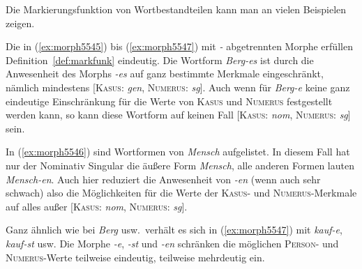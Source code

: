 Die Markierungsfunktion von Wortbestandteilen kann man an vielen Beispielen zeigen.

\begin{exe}
  \ex \label{ex:morph5545}
  \begin{xlist}
  \end{xlist}
  \ex \label{ex:morph5546}
  \begin{xlist}
  \end{xlist}
  \ex \label{ex:morph5547}
  \begin{xlist}
  \end{xlist}
\end{exe}

Die in (\ref{ex:morph5545}) bis (\ref{ex:morph5547}) mit \textit{-} abgetrennten Morphe erfüllen Definition~\ref{def:markfunk} eindeutig.
Die Wortform \textit{Berg-es} ist durch die Anwesenheit des Morphs \textit{-es} auf ganz bestimmte Merkmale eingeschränkt, nämlich mindestens [\textsc{Kasus}: \textit{gen}, \textsc{Numerus}: \textit{sg}].
\label{abs:4578239547}Auch wenn für \textit{Berg-e} keine ganz eindeutige Einschränkung für die Werte von \textsc{Kasus} und \textsc{Numerus} festgestellt werden kann, so kann diese Wortform \zB auf keinen Fall [\textsc{Kasus}: \textit{nom}, \textsc{Numerus}: \textit{sg}] sein.

In (\ref{ex:morph5546}) sind Wortformen von \textit{Mensch} aufgelistet.
In diesem Fall hat nur der Nominativ Singular die äußere Form \textit{Mensch}, alle anderen Formen lauten \textit{Mensch-en}.
Auch hier reduziert die Anwesenheit von \textit{-en} (wenn auch sehr schwach) also die Möglichkeiten für die Werte der \textsc{Kasus}- und \textsc{Numerus}-Merkmale auf alles außer [\textsc{Kasus}: \textit{nom}, \textsc{Numerus}: \textit{sg}].


Ganz ähnlich wie bei \textit{Berg} usw.\ verhält es sich in (\ref{ex:morph5547}) mit \textit{kauf-e}, \textit{kauf-st} usw.
Die Morphe \textit{-e}, \textit{-st} und \textit{-en} schränken die möglichen \textsc{Person}- und \textsc{Numerus}-Werte teilweise eindeutig, teilweise mehrdeutig ein.

